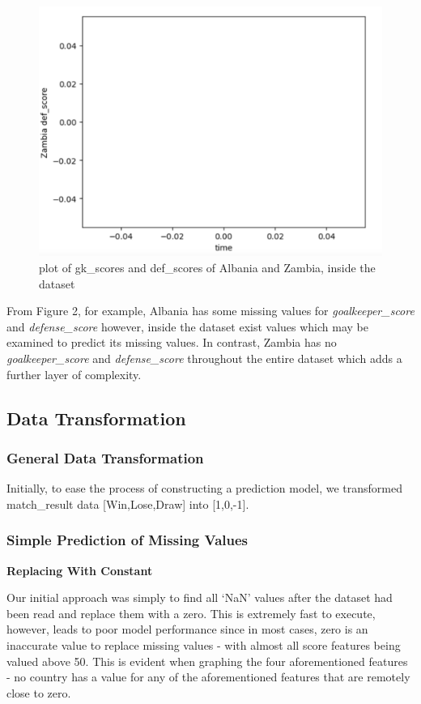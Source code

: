 \documentclass[8pt]{article}
\begin{document}
\begin{figure}[H]
    \includegraphics[scale=.3]{zam_def_values.png}
    \caption{plot of gk\_scores and def\_scores of Albania and Zambia, inside the dataset}
    \label{fig:posscores}
\end{figure}


From Figure 2, for example, Albania has some missing values for \textit{goalkeeper\_score} and \textit{defense\_score} however, inside the dataset exist values which may be examined to predict its missing values. In contrast, Zambia has no \textit{goalkeeper\_score} and \textit{defense\_score} throughout the entire dataset which adds a further layer of complexity.

\label{sec:exploration}
\subsection{Data Transformation}
\label{sec:miss sec}
\subsubsection{General Data Transformation}
Initially, to ease the process of constructing a prediction model, we transformed match\_result data [Win,Lose,Draw] into [1,0,-1].

\subsubsection{Simple Prediction of Missing Values}

\textbf{Replacing With Constant}\vspace{0.05cm}

Our initial approach was simply to find all `NaN' values after the dataset had been read and replace them with a zero. This is extremely fast to execute, however, leads to poor model performance since in most cases, zero is an inaccurate value to replace missing values - with almost all score features being valued above 50. This is evident when graphing the four aforementioned features - no country has a value for any of the aforementioned features that are remotely close to zero.
\end{document}
